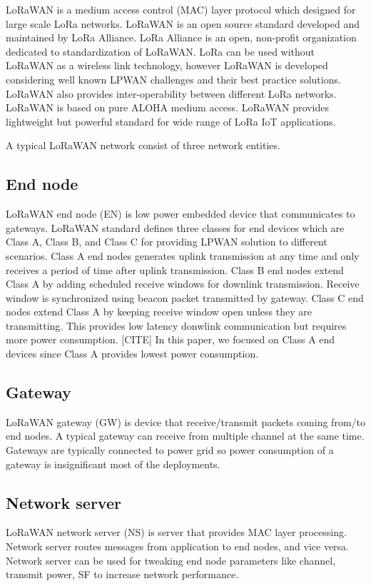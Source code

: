 \documentclass[conference]{IEEEtran}
\begin{document}
\par LoRaWAN is a medium access control (MAC) layer protocol which designed for large scale LoRa networks. LoRaWAN is an open source standard developed and maintained by LoRa Alliance. LoRa Alliance is an open, non-profit organization dedicated to standardization of LoRaWAN. LoRa can be used without LoRaWAN as a wireless link technology, however LoRaWAN is developed considering well known LPWAN challenges and their best practice solutions. LoRaWAN also provides inter-operability between different LoRa networks. LoRaWAN is based on pure ALOHA medium access. LoRaWAN provides lightweight but powerful standard for wide range of LoRa IoT applications.

\par A typical LoRaWAN network consist of three network entities.

\subsection{End node}
\par LoRaWAN end node (EN) is low power embedded device that communicates to gateways. LoRaWAN standard defines three classes for end devices which are Class A, Class B, and Class C for providing LPWAN solution to different scenarios. Class A end nodes generates uplink transmission at any time and only receives a period of time after uplink transmission. Class B end nodes extend Class A by adding scheduled receive windows for downlink transmission. Receive window is synchronized using beacon packet transmitted by gateway. Class C end nodes extend Class A by keeping receive window open unless they are transmitting. This provides low latency donwlink communication but requires more power consumption. [CITE] In this paper, we focused on Class A end devices since Class A provides lowest power consumption.

\subsection{Gateway}
\par LoRaWAN gateway (GW) is device that receive/transmit packets coming from/to end nodes. A typical gateway can receive from multiple channel at the same time. Gateways are typically connected to power grid so power consumption of a gateway is insignificant most of the deployments.

\subsection{Network server}
\par LoRaWAN network server (NS) is server that provides MAC layer processing. Network server routes messages from application to end nodes, and vice versa. Network server can be used for tweaking end node parameters like channel, transmit power, SF to increase network performance.
\end{document}
